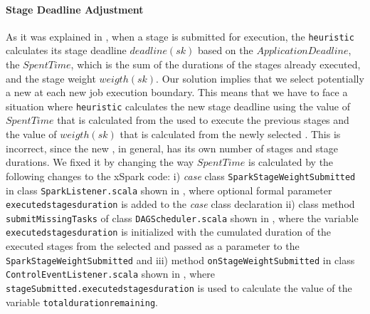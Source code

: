 \paragraph{Stage Deadline Adjustment}\label{sec:stage_deadline_adjustment}
As it was explained in , when a stage is submitted for execution, the \texttt{heuristic} calculates its stage deadline $deadline(sk)$ based on the   $ApplicationDeadline$, the $SpentTime$, which is the sum of the durations of the stages already executed, and the stage weight $weigth(sk)$. Our solution implies that we select potentially a new \plan at each new job execution boundary. This means that we have to face a situation where \texttt{heuristic} calculates the new stage deadline using the value of $SpentTime$ that is calculated from the \plan used to execute the previous stages and the value of $weigth(sk)$ that is calculated from the newly selected \plan. This is incorrect, since the new \plan, in general, has its own number of stages and stage durations. We fixed it by changing the way  $SpentTime$ is calculated by the following changes to the xSpark code: i) \textit{case} class \texttt{SparkStageWeightSubmitted} in class \texttt{SparkListener.scala} shown in , where optional formal parameter \texttt{executedstagesduration} is added to the \textit{case} class declaration ii) class method \texttt{submitMissingTasks} of class \texttt{DAGScheduler.scala} shown in , where the variable \texttt{executedstagesduration} is initialized with the cumulated duration of the executed stages from the selected \plan and passed as a parameter to the \texttt{SparkStageWeightSubmitted} and iii) method \texttt{onStageWeightSubmitted} in class \texttt{ControlEventListener.scala} shown in , where \texttt{stageSubmitted.executedstagesduration} is used to calculate the value of the variable \texttt{totaldurationremaining}. 





